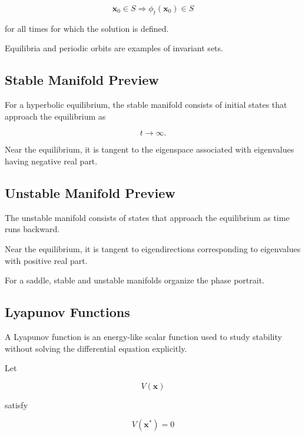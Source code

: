 \[
\boxed{
\mathbf{x}_0\in S
\Rightarrow
\phi_t(\mathbf{x}_0)\in S
}
\]

for all times for which the solution is defined.

Equilibria and periodic orbits are examples of invariant sets.

\subsection{Stable Manifold Preview}
\label{subsec:stable-manifold-preview}

For a hyperbolic equilibrium, the stable manifold consists of initial
states that approach the equilibrium as

\[
t\to\infty.
\]

Near the equilibrium, it is tangent to the eigenspace associated with
eigenvalues having negative real part.

\subsection{Unstable Manifold Preview}
\label{subsec:unstable-manifold-preview}

The unstable manifold consists of states that approach the equilibrium as
time runs backward.

Near the equilibrium, it is tangent to eigendirections corresponding to
eigenvalues with positive real part.

For a saddle, stable and unstable manifolds organize the phase portrait.

\subsection{Lyapunov Functions}
\label{subsec:lyapunov-functions}

A Lyapunov function is an energy-like scalar function used to study
stability without solving the differential equation explicitly.

Let

\[
V(\mathbf{x})
\]

satisfy

\[
\boxed{
V(\mathbf{x}^*)=0
}
\]

